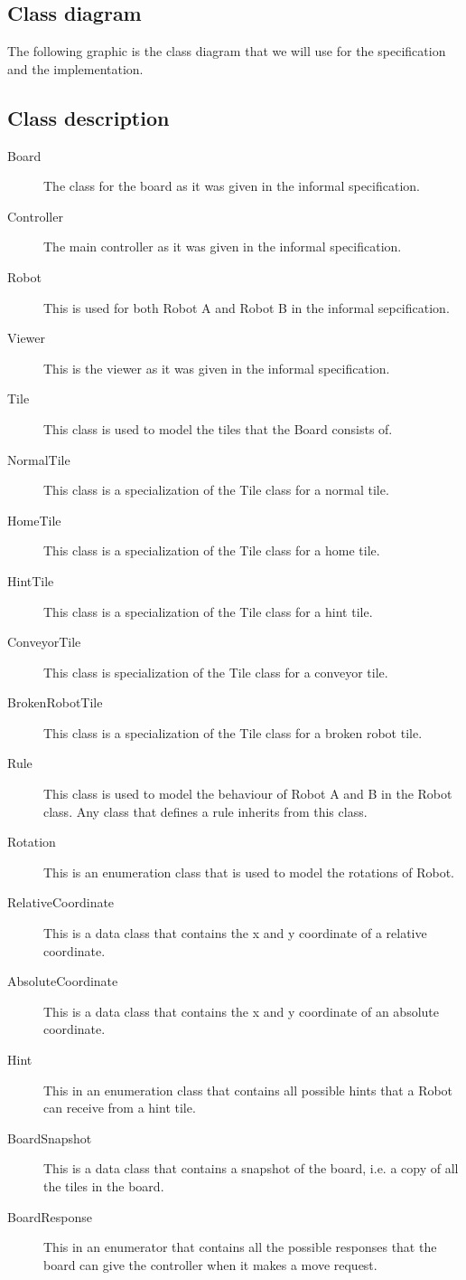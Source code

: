 \subsection{Class diagram}
	The following graphic is the class diagram that we will use for the specification and the implementation.

	

\subsection{Class description}
	\begin{description}
		\item[Board] The class for the board as it was given in the informal specification.
		\item[Controller] The main controller as it was given in the informal specification.
		\item[Robot] This is used for both Robot A and Robot B in the informal sepcification.
		\item[Viewer] This is the viewer as it was given in the informal specification.
		\item[Tile] This class is used to model the tiles that the Board consists of.
		\item[NormalTile] This class is a specialization of the Tile class for a normal tile.
		\item[HomeTile] This class is a specialization of the Tile class for a home tile.
		\item[HintTile] This class is a specialization of the Tile class for a hint tile.
		\item[ConveyorTile] This class is specialization of the Tile class for a conveyor tile.
		\item[BrokenRobotTile] This class is a specialization of the Tile class for a broken robot tile.
		\item[Rule] This class is used to model the behaviour of Robot A and B in the Robot class. Any class that defines a rule inherits from this class.
		\item[Rotation] This is an enumeration class that is used to model the rotations of Robot.
		\item[RelativeCoordinate] This is a data class that contains the x and y coordinate of a relative coordinate.
		\item[AbsoluteCoordinate] This is a data class that contains the x and y coordinate of an absolute coordinate.
		\item[Hint] This in an enumeration class that contains all possible hints that a Robot can receive from a hint tile.
		\item[BoardSnapshot] This is a data class that contains a snapshot of the board, i.e. a copy of all the tiles in the board.
		\item[BoardResponse] This in an enumerator that contains all the possible responses that the board can give the controller when it makes a move request.
	\end{description}
